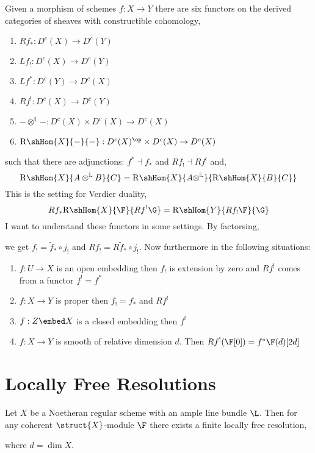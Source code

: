 \documentclass[12pt]{article}
\begin{document}
\newcommand{\dtensor}{\otimes^{\mathbb{L}}}
\newcommand{\RHom}[3]{\mathrm{R}\shHom{#1}{#2}{#3}}

Given a morphism of schemes $f : X \to Y$ there are six functors on the derived categories of \etale sheaves with constructible cohomology,
\begin{enumerate}
\item $R f_* : D^c(X) \to D^c(Y)$
\item $L f_! : D^c(X) \to D^c(Y)$
\item $L f^* : D^c(Y) \to D^c(X)$
\item $R f^! : D^c(X) \to D^c(Y)$
\item $- \dtensor - : D^c(X) \times D^c(X) \to D^c(X)$
\item $\RHom{X}{-}{-} : D^c(X)^\op \times D^c(X) \to D^c(X)$
\end{enumerate}
such that there are adjunctions: $f^* \dashv f_*$ and $R f_! \dashv R f^!$ and,
\[ \RHom{X}{A \dtensor B}{C} = \RHom{X}{A \dtensor}{\RHom{X}{B}{C}} \]
This is the setting for Verdier duality,
\[ R f_* \RHom{X}{\F}{ R f^! \G} = \RHom{Y}{Rf_! \F}{\G} \]
I want to understand these functors in some settings. By factorsing,
\begin{center}
\end{center}
we get $f_! = \tilde{f}_* \circ j_!$ and $R f_! = R \tilde{f}_* \circ j_!$. Now furthermore in the following situations:
\begin{enumerate}
\item $f : U \to X$ is an open embedding then $f_!$ is extension by zero and $R f^!$ comes from a functor $f^! = f^*$
\item $f : X \to Y$ is proper then $f_! = f_*$ and $R f^!$
\item $f : Z \embed X$ is a closed embedding then $f^! $
\item $f : X \to Y$ is smooth of relative dimension $d$. Then $R f^!(\F[0]) = f^* \F(d) [2 d]$
\end{enumerate}

\section{Locally Free Resolutions}

\begin{prop}
Let $X$ be a Noetheran regular scheme with an ample line bundle $\L$. Then for any coherent $\struct{X}$-module $\F$ there exists a finite locally free resolution,
\begin{center}
\end{center}
where $d = \dim{X}$.
\end{prop}
\end{document}
